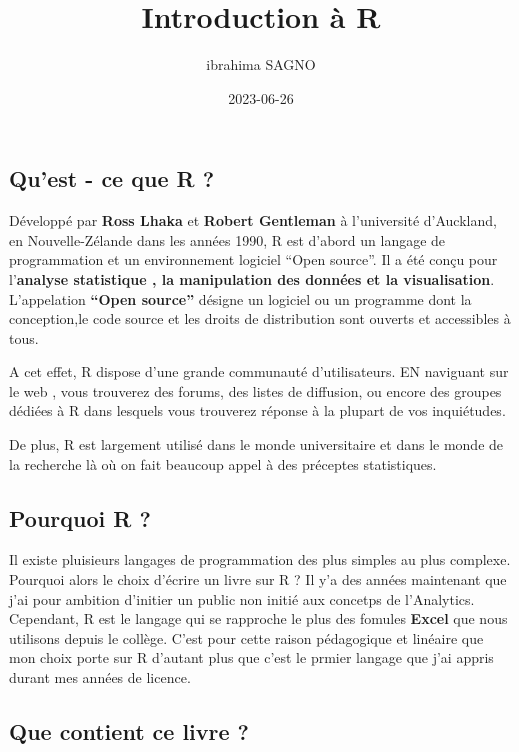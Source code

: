 \documentclass[
]{article}
\title{Introduction à R}
\author{ibrahima SAGNO}
\date{2023-06-26}
\begin{document}
\maketitle

\hypertarget{quest---ce-que-r}{%
\subsection{Qu'est - ce que R ?}\label{quest---ce-que-r}}

Développé par \textbf{Ross Lhaka} et \textbf{Robert Gentleman} à
l'université d'Auckland, en Nouvelle-Zélande dans les années 1990, R est
d'abord un langage de programmation et un environnement logiciel ``Open
source''. Il a été conçu pour l'\textbf{analyse statistique , la
manipulation des données et la visualisation}. L'appelation
\textbf{``Open source''} désigne un logiciel ou un programme dont la
conception,le code source et les droits de distribution sont ouverts et
accessibles à tous.

A cet effet, R dispose d'une grande communauté d'utilisateurs. EN
naviguant sur le web , vous trouverez des forums, des listes de
diffusion, ou encore des groupes dédiées à R dans lesquels vous
trouverez réponse à la plupart de vos inquiétudes.

De plus, R est largement utilisé dans le monde universitaire et dans le
monde de la recherche là où on fait beaucoup appel à des préceptes
statistiques.

\hypertarget{pourquoi-r}{%
\subsection{Pourquoi R ?}\label{pourquoi-r}}

Il existe pluisieurs langages de programmation des plus simples au plus
complexe. Pourquoi alors le choix d'écrire un livre sur R ? Il y'a des
années maintenant que j'ai pour ambition d'initier un public non initié
aux concetps de l'Analytics. Cependant, R est le langage qui se
rapproche le plus des fomules \textbf{Excel} que nous utilisons depuis
le collège. C'est pour cette raison pédagogique et linéaire que mon
choix porte sur R d'autant plus que c'est le prmier langage que j'ai
appris durant mes années de licence.

\hypertarget{que-contient-ce-livre}{%
\subsection{Que contient ce livre ?}\label{que-contient-ce-livre}}
\end{document}
